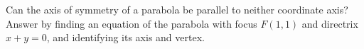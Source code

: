 Can the axis of symmetry of a parabola be parallel to neither coordinate axis? Answer by finding an equation of the parabola with focus $F(1,1)$ and directrix $x+y=0$, and identifying its axis and vertex.
